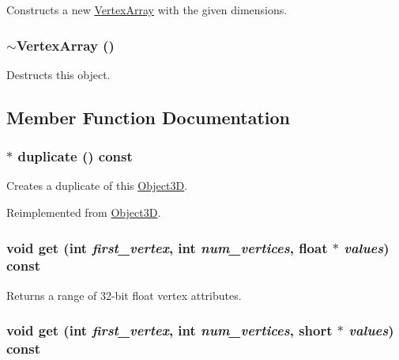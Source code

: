 Constructs a new \hyperlink{classm3g_1_1VertexArray}{VertexArray} with the given dimensions. \hypertarget{classm3g_1_1VertexArray_267fa63cb2f4216729437dc826415911}{
\subsubsection[{$\sim$VertexArray}]{\setlength{\rightskip}{0pt plus 5cm}$\sim${\bf VertexArray} ()}}
\label{classm3g_1_1VertexArray_267fa63cb2f4216729437dc826415911}


Destructs this object. 

\subsection{Member Function Documentation}
\hypertarget{classm3g_1_1VertexArray_f0dc6a5510bf837ef48129f344d666a8}{
\subsubsection[{duplicate}]{ $\ast$ duplicate () const}}
\label{classm3g_1_1VertexArray_f0dc6a5510bf837ef48129f344d666a8}


Creates a duplicate of this \hyperlink{classm3g_1_1Object3D}{Object3D}. 

Reimplemented from \hyperlink{classm3g_1_1Object3D_a25110dac934f867b83b73ad4741a0f4}{Object3D}.\hypertarget{classm3g_1_1VertexArray_79b1ffd7586fe23fb5e31661e4d296e3}{
\subsubsection[{get}]{\setlength{\rightskip}{0pt plus 5cm}void get (int {\em first\_\-vertex}, \/  int {\em num\_\-vertices}, \/  float $\ast$ {\em values}) const}}
\label{classm3g_1_1VertexArray_79b1ffd7586fe23fb5e31661e4d296e3}


Returns a range of 32-bit float vertex attributes. \hypertarget{classm3g_1_1VertexArray_575822f60d7b5e74ed51e94851123038}{
\subsubsection[{get}]{\setlength{\rightskip}{0pt plus 5cm}void get (int {\em first\_\-vertex}, \/  int {\em num\_\-vertices}, \/  short $\ast$ {\em values}) const}}
\label{classm3g_1_1VertexArray_575822f60d7b5e74ed51e94851123038}


